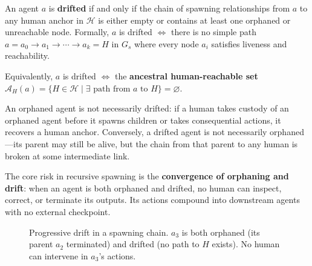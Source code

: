 \begin{definition}
An agent $a$ is \textbf{drifted} if and only if the chain of spawning relationships from $a$ to any human anchor in $\mathcal{H}$ is either empty or contains at least one orphaned or unreachable node. Formally, $a$ is drifted $\iff$ there is no simple path $a = a_0 \to a_1 \to \cdots \to a_k = H$ in $G_s$ where every node $a_i$ satisfies liveness and reachability.

Equivalently, $a$ is drifted $\iff$ the \textbf{ancestral human-reachable set} $\mathcal{A}_H(a) = \{ H \in \mathcal{H} \mid \exists \text{ path from } a \text{ to } H \} = \varnothing$.
\end{definition}

An orphaned agent is not necessarily drifted: if a human takes custody of an orphaned agent before it spawns children or takes consequential actions, it recovers a human anchor. Conversely, a drifted agent is not necessarily orphaned—its parent may still be alive, but the chain from that parent to any human is broken at some intermediate link.

The core risk in recursive spawning is the \textbf{convergence of orphaning and drift}: when an agent is both orphaned and drifted, no human can inspect, correct, or terminate its outputs. Its actions compound into downstream agents with no external checkpoint.

\begin{figure}[htbp]
\centering
{}
\caption{Progressive drift in a spawning chain. $a_3$ is both orphaned (its parent $a_2$ terminated) and drifted (no path to $H$ exists). No human can intervene in $a_3$'s actions.}
\label{fig:drift_progression}
\end{figure}

